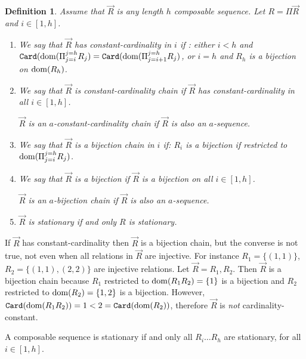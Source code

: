 \documentclass{lmcs}
\newtheorem{definition}[theorem]{Definition}
\begin{document}
\begin{definition}
Assume that $\vec{R}$ is any length $h$ composable sequence.
Let $R = \Pi \vec{R}$ and $i \in [1,h]$.

\begin{enumerate}
\item
We say that $\vec{R}$ has constant-cardinality in $i$ if :
either $i<h$ and
${\tt Card}({\rm dom}(\Pi_{j=i}^{j=h} R_j)  = {\tt Card}({\rm dom}(\Pi_{j=i+1}^{j=h} R_j)$,
or $i=h$ and $R_h$ is a bijection on ${\rm dom}(R_h)$.

\item
We say that $\vec{R}$ is constant-cardinality chain if $\vec{R}$ has constant-cardinality
in all $i \in [1,h]$.

$\vec{R}$ is an $a$-constant-cardinality chain if $\vec{R}$ is also an $a$-sequence.

\item
We say that $\vec{R}$ is a bijection chain in $i$ if:
$R_i$ is a bijection if restricted to ${\rm dom}(\Pi_{j=i}^{j=h} R_j)$.

\item
We say that $\vec{R}$ is a bijection if $\vec{R}$ is a bijection on all $i \in [1,h]$. 

$\vec{R}$ is an $a$-bijection chain if $\vec{R}$ is also an $a$-sequence.


\item
$\vec{R}$ is stationary if and only $R$ is stationary.
\end{enumerate}

\end{definition}

If $\vec{R}$ has constant-cardinality then $\vec{R}$ is a bijection chain,
but the converse is not true, not even when all relations in $\vec{R}$ are
injective. 
For instance $R_1=\{(1,1)\}$, $R_2=\{(1,1), (2,2)\}$
are injective relations. Let $\vec{R}=R_1,R_2$. Then $\vec{R}$ is a bijection chain because
$R_1$ restricted to ${\rm dom}(R_1R_2) = \{1\}$ is a bijection and 
$R_2$ restricted to ${\rm dom}(R_2) = \{1,2\}$ is a bijection. However, 
${\tt Card}({\rm dom}(R_1R_2))  = 1 < 2 = {\tt Card}({\rm dom}(R_2))$, therefore 
$\vec{R}$ is \emph{not} cardinality-constant.

A composable sequence is stationary if and only all $R_i \ldots R_h$ are stationary, 
for all $i \in [1,h]$. 
\end{document}
